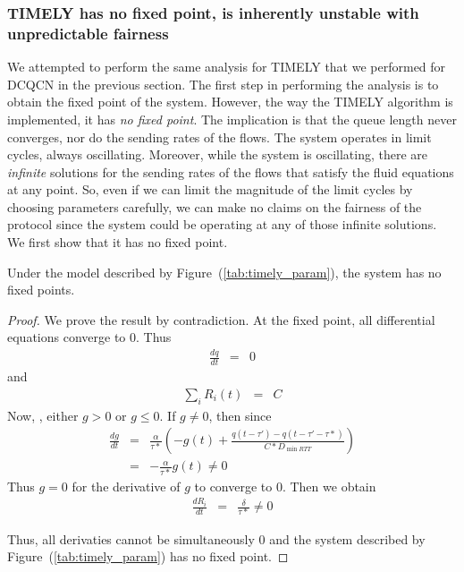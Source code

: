 \subsubsection{TIMELY has no fixed point, is inherently unstable with
unpredictable fairness}
We attempted to perform the same analysis for TIMELY that we performed for DCQCN
in the previous section.  The first step in performing the analysis is to obtain
the fixed point of the system.  However, the way the TIMELY algorithm is
implemented, it has \emph{no fixed point}. The implication is that the queue
length never converges, nor do the sending rates of the flows. The system
operates in limit cycles, always oscillating. Moreover, while the system is
oscillating, there are \emph{infinite} solutions for the sending rates of the
flows that satisfy the fluid equations at any point. So, even if we can limit
the magnitude of the limit cycles by choosing parameters carefully, we can make
no claims on the fairness of the protocol since the system could be operating at
any of those infinite solutions. We first show that it has no fixed point.

\begin{thm} 
\label{thm:nofixed}
Under the model described by Figure~(\ref{tab:timely_param}), the system has no
fixed points.
\end{thm}
\begin{proof}
We prove the result by contradiction. At the fixed point, all
differential equations converge to 0. Thus
\small
\begin{eqnarray*}
\frac{dq}{dt} & =& 0 
\end{eqnarray*} \normalsize  and 
\small
\begin{eqnarray*}
\sum_{i} R_i(t) & = & C 
\end{eqnarray*}
\normalsize
Now, , either $g > 0$ or $g  \le 0$. If $g \ne 0$, then since 
\small
\begin{eqnarray*}
\frac{{dg}}{{dt}} & = & \frac{\alpha }{{\tau *}}( - g(t) + \frac{{q(t
                        - \tau ') - q(t - \tau ' - \tau
                        *)}}{{C*{D_{\min RTT}}}})\\
& = &  -\frac{\alpha }{{\tau *}} g(t)  \ne  0 
\end{eqnarray*}
\normalsize
Thus $ g = 0$ for the derivative of  $g$ to converge to 0. Then we obtain
\small
\begin{eqnarray*}
 \frac{dR_i}{dt} & = & \frac{\delta }{{\tau *}} \ne  0
\end{eqnarray*}
\normalsize

Thus, all derivaties cannot be simultaneously 0 and the system
described by Figure~(\ref{tab:timely_param}) has no fixed point.
\end{proof}


